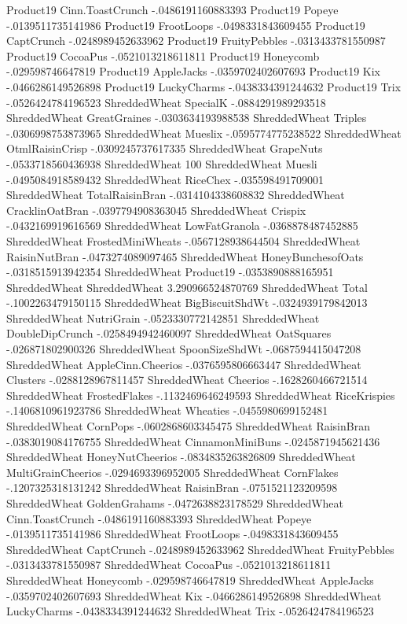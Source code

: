Product19	Cinn.ToastCrunch	-.0486191160883393
Product19	Popeye	-.0139511735141986
Product19	FrootLoops	-.0498331843609455
Product19	CaptCrunch	-.0248989452633962
Product19	FruityPebbles	-.0313433781550987
Product19	CocoaPus	-.0521013218611811
Product19	Honeycomb	-.029598746647819
Product19	AppleJacks	-.0359702402607693
Product19	Kix	-.0466286149526898
Product19	LuckyCharms	-.0438334391244632
Product19	Trix	-.0526424784196523
ShreddedWheat	SpecialK	-.0884291989293518
ShreddedWheat	GreatGraines	-.0303634193988538
ShreddedWheat	Triples	-.0306998753873965
ShreddedWheat	Mueslix	-.0595774775238522
ShreddedWheat	OtmlRaisinCrisp	-.0309245737617335
ShreddedWheat	GrapeNuts	-.0533718560436938
ShreddedWheat	100%
ShreddedWheat	Muesli	-.0495084918589432
ShreddedWheat	RiceChex	-.035598491709001
ShreddedWheat	TotalRaisinBran	-.0314104338608832
ShreddedWheat	CracklinOatBran	-.0397794908363045
ShreddedWheat	Crispix	-.0432169919616569
ShreddedWheat	LowFatGranola	-.0368878487452885
ShreddedWheat	FrostedMiniWheats	-.0567128938644504
ShreddedWheat	RaisinNutBran	-.0473274089097465
ShreddedWheat	HoneyBunchesofOats	-.0318515913942354
ShreddedWheat	Product19	-.0353890888165951
ShreddedWheat	ShreddedWheat	3.290966524870769
ShreddedWheat	Total	-.1002263479150115
ShreddedWheat	BigBiscuitShdWt	-.0324939179842013
ShreddedWheat	NutriGrain	-.0523330772142851
ShreddedWheat	DoubleDipCrunch	-.0258494942460097
ShreddedWheat	OatSquares	-.026871802900326
ShreddedWheat	SpoonSizeShdWt	-.0687594415047208
ShreddedWheat	AppleCinn.Cheerios	-.0376595806663447
ShreddedWheat	Clusters	-.0288128967811457
ShreddedWheat	Cheerios	-.1628260466721514
ShreddedWheat	FrostedFlakes	-.1132469646249593
ShreddedWheat	RiceKrispies	-.1406810961923786
ShreddedWheat	Wheaties	-.0455980699152481
ShreddedWheat	CornPops	-.0602868603345475
ShreddedWheat	RaisinBran	-.0383019084176755
ShreddedWheat	CinnamonMiniBuns	-.0245871945621436
ShreddedWheat	HoneyNutCheerios	-.0834835263826809
ShreddedWheat	MultiGrainCheerios	-.0294693396952005
ShreddedWheat	CornFlakes	-.1207325318131242
ShreddedWheat	RaisinBran	-.0751521123209598
ShreddedWheat	GoldenGrahams	-.0472638823178529
ShreddedWheat	Cinn.ToastCrunch	-.0486191160883393
ShreddedWheat	Popeye	-.0139511735141986
ShreddedWheat	FrootLoops	-.0498331843609455
ShreddedWheat	CaptCrunch	-.0248989452633962
ShreddedWheat	FruityPebbles	-.0313433781550987
ShreddedWheat	CocoaPus	-.0521013218611811
ShreddedWheat	Honeycomb	-.029598746647819
ShreddedWheat	AppleJacks	-.0359702402607693
ShreddedWheat	Kix	-.0466286149526898
ShreddedWheat	LuckyCharms	-.0438334391244632
ShreddedWheat	Trix	-.0526424784196523
